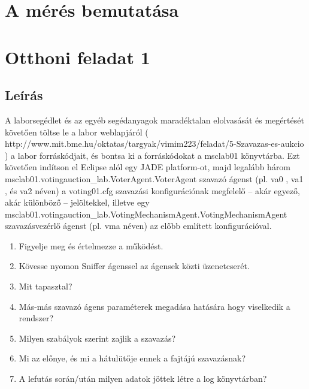 
\section{A mérés bemutatása}


\section{Otthoni feladat 1}
\subsection{Leírás}
A laborsegédlet és az egyéb segédanyagok maradéktalan elolvasását és megértését követően
töltse le a labor weblapjáról ( http://www.mit.bme.hu/oktatas/targyak/vimim223/feladat/5-Szavazas-es-aukcio ) a
labor forráskódjait, és bontsa ki a forráskódokat a  msclab01 könyvtárba. Ezt
követően indítson el Eclipse alól egy JADE platform-ot, majd legalább három
msclab01.votingauction\_lab.VoterAgent.VoterAgent szavazó ágenst (pl.  va0 ,
va1 , és  va2 néven) a voting01.cfg szavazási
konfigurációnak megfelelő – akár egyező, akár különböző – jelöltekkel, illetve egy
msclab01.votingauction\_lab.VotingMechanismAgent.VotingMechanismAgent
szavazásvezérlő ágenst (pl.  vma néven) az előbb említett konfigurációval.
\begin{enumerate}
	\item Figyelje meg és értelmezze a működést.
	\item Kövesse nyomon Sniffer ágenssel az ágensek közti üzenetcserét.
	\item Mit tapasztal?
	\item Más-más szavazó ágens paraméterek megadása hatására hogy viselkedik a rendszer?
	\item Milyen szabályok szerint zajlik a szavazás?
	\item Mi az előnye, és mi a hátulütője ennek a fajtájú szavazásnak?
	\item A lefutás során/után milyen adatok jöttek létre a log
	könyvtárban?
\end{enumerate}

